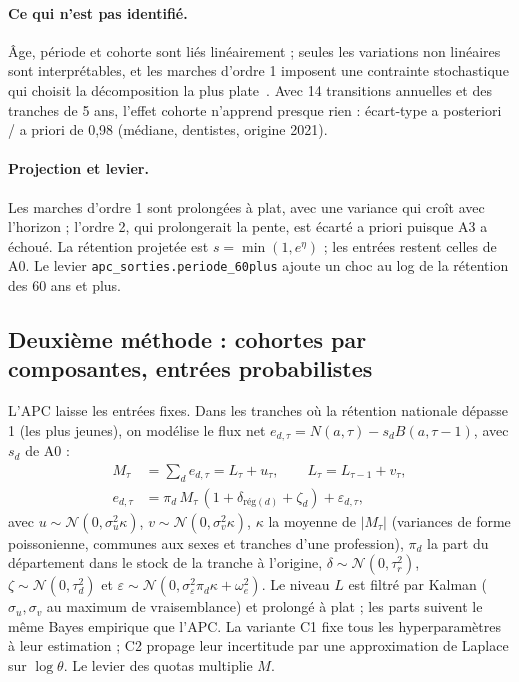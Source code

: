 \paragraph{Ce qui n'est pas identifié.} Âge, période et cohorte sont liés linéairement ; seules les
variations non linéaires sont interprétables, et les marches d'ordre 1 imposent une contrainte
stochastique qui choisit la décomposition la plus plate~\cite{a2-schmid2007bamp}. Avec 14 transitions
annuelles et des tranches de 5 ans, l'effet cohorte n'apprend presque rien : écart-type a posteriori /
a priori de 0,98\mesure{} (médiane, dentistes, origine 2021).

\paragraph{Projection et levier.} Les marches d'ordre 1 sont prolongées à plat, avec une variance qui
croît avec l'horizon ; l'ordre 2, qui prolongerait la pente, est écarté a priori puisque A3 a échoué.
La rétention projetée est $s = \min(1, e^{\eta})$ ; les entrées restent celles de A0. Le levier
\texttt{apc\_sorties.periode\_60plus} ajoute un choc au log de la rétention des 60 ans et plus.

\subsection{Deuxième méthode : cohortes par composantes, entrées probabilistes}
\label{a2-sec:cohortes}
L'APC laisse les entrées fixes. Dans les tranches où la rétention nationale dépasse 1 (les plus
jeunes), on modélise le flux net $e_{d,\tau} = N(a,\tau) - s_d B(a,\tau-1)$, avec $s_d$ de A0 :
\begin{align}
  M_\tau &= \textstyle\sum_d e_{d,\tau} = L_\tau + u_\tau, \qquad L_\tau = L_{\tau-1} + v_\tau, \\
  e_{d,\tau} &= \pi_d\, M_\tau\,(1 + \delta_{\text{rég}(d)} + \zeta_d) + \varepsilon_{d,\tau},
\end{align}
avec $u \sim \mathcal N(0,\sigma_u^2\kappa)$, $v \sim \mathcal N(0,\sigma_v^2\kappa)$, $\kappa$ la
moyenne de $|M_\tau|$ (variances de forme poissonienne, communes aux sexes et tranches d'une
profession), $\pi_d$ la part du département dans le stock de la tranche à l'origine,
$\delta \sim \mathcal N(0,\tau_r^2)$, $\zeta \sim \mathcal N(0,\tau_d^2)$ et
$\varepsilon \sim \mathcal N(0, \sigma_\varepsilon^2 \pi_d \kappa + \omega_e^2)$. Le niveau $L$ est
filtré par Kalman ($\sigma_u, \sigma_v$ au maximum de vraisemblance) et prolongé à plat ; les parts
suivent le même Bayes empirique que l'APC. La variante C1 fixe tous les hyperparamètres à leur
estimation ; C2 propage leur incertitude par une approximation de Laplace sur $\log\theta$. Le levier
des quotas multiplie $M$.

